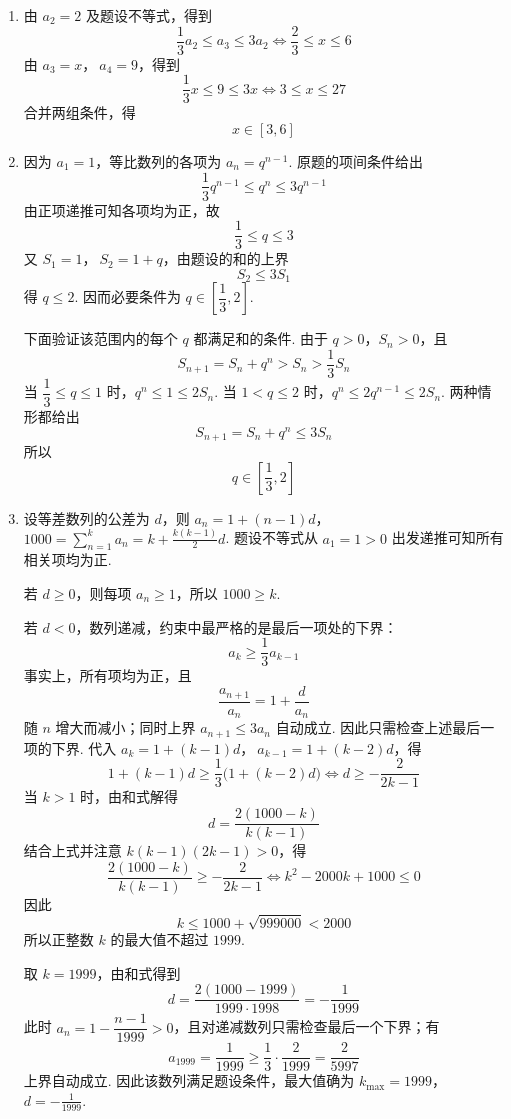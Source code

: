 \begin{solution}
\begin{enumerate}
\item 由 \(a_2=2\) 及题设不等式，得到
\[
\frac13a_2\leqslant a_3\leqslant3a_2
\iff \frac23\leqslant x\leqslant6
\]
由 \(a_3=x\)，\(\ a_4=9\)，得到
\[
\frac13x\leqslant9\leqslant3x
\iff 3\leqslant x\leqslant27
\]
合并两组条件，得
\[
x\in[3,6]
\]
\item 因为 \(a_1=1\)，等比数列的各项为 \(a_n=q^{n-1}\). 原题的项间条件给出
\[
\frac13q^{n-1}\leqslant q^n\leqslant3q^{n-1}
\]
由正项递推可知各项均为正，故
\[
\frac13\leqslant q\leqslant3
\]
又 \(S_1=1\)，\(\ S_2=1+q\)，由题设的和的上界
\[
S_2\leqslant3S_1
\]
得 \(q\leqslant2\). 因而必要条件为 \(q\in\left[\dfrac13,2\right]\).

下面验证该范围内的每个 \(q\) 都满足和的条件. 由于 \(q>0\)，\(S_n>0\)，且
\[
S_{n+1}=S_n+q^n>S_n>\frac13S_n
\]
当 \(\dfrac13\leqslant q\leqslant1\) 时，\(q^n\leqslant1\leqslant2S_n\). 当 \(1<q\leqslant2\) 时，\(q^n\leqslant2q^{n-1}\leqslant2S_n\). 两种情形都给出
\[
S_{n+1}=S_n+q^n\leqslant3S_n
\]
所以
\[
q\in\left[\frac13,2\right]
\]
\item 设等差数列的公差为 \(d\)，则
\(a_n=1+(n-1)d\)，\(1000=\sum_{n=1}^k a_n =k+\frac{k(k-1)}2d\).
题设不等式从 \(a_1=1>0\) 出发递推可知所有相关项均为正.

若 \(d\geqslant0\)，则每项 \(a_n\geqslant1\)，所以 \(1000\geqslant k\).

若 \(d<0\)，数列递减，约束中最严格的是最后一项处的下界：
\[
a_k\geqslant\frac13a_{k-1}
\]
事实上，所有项均为正，且
\[
\frac{a_{n+1}}{a_n}=1+\frac{d}{a_n}
\]
随 \(n\) 增大而减小；同时上界 \(a_{n+1}\leqslant3a_n\) 自动成立. 因此只需检查上述最后一项的下界.
代入 \(a_k=1+(k-1)d\)，\(\ a_{k-1}=1+(k-2)d\)，得
\[
1+(k-1)d\geqslant\frac13\bigl(1+(k-2)d\bigr)
\iff d\geqslant-\frac2{2k-1}
\]
当 \(k>1\) 时，由和式解得
\[
d=\frac{2(1000-k)}{k(k-1)}
\]
结合上式并注意 \(k(k-1)(2k-1)>0\)，得
\[
\frac{2(1000-k)}{k(k-1)}\geqslant-\frac2{2k-1}
\iff k^2-2000k+1000\leqslant0
\]
因此
\[
k\leqslant1000+\sqrt{999000}<2000
\]
所以正整数 \(k\) 的最大值不超过 \(1999\).

取 \(k=1999\)，由和式得到
\[
d=\frac{2(1000-1999)}{1999\cdot1998}
=-\frac1{1999}
\]
此时 \(a_n=1-\dfrac{n-1}{1999}>0\)，且对递减数列只需检查最后一个下界；有
\[
a_{1999}=\frac1{1999}
\geqslant\frac13\cdot\frac2{1999}
=\frac2{5997}
\]
上界自动成立. 因此该数列满足题设条件，最大值确为
\(k_{\max}=1999\)，\(d=-\frac1{1999}\).
\end{enumerate}
\end{solution}
